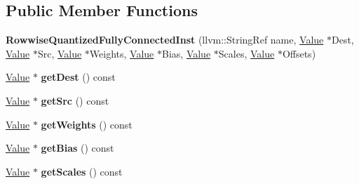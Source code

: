 \subsection*{Public Member Functions}
\begin{DoxyCompactItemize}
\item 
\mbox{\label{classglow_1_1_rowwise_quantized_fully_connected_inst_a772057e235a3455d5b590dc71480998e}} 
{\bfseries Rowwise\+Quantized\+Fully\+Connected\+Inst} (llvm\+::\+String\+Ref name, \hyperlink{classglow_1_1_value}{Value} $\ast$Dest, \hyperlink{classglow_1_1_value}{Value} $\ast$Src, \hyperlink{classglow_1_1_value}{Value} $\ast$Weights, \hyperlink{classglow_1_1_value}{Value} $\ast$Bias, \hyperlink{classglow_1_1_value}{Value} $\ast$Scales, \hyperlink{classglow_1_1_value}{Value} $\ast$Offsets)
\item 
\mbox{\label{classglow_1_1_rowwise_quantized_fully_connected_inst_a5810e81d3864eee9b4a4b1440669f871}} 
\hyperlink{classglow_1_1_value}{Value} $\ast$ {\bfseries get\+Dest} () const
\item 
\mbox{\label{classglow_1_1_rowwise_quantized_fully_connected_inst_a4c6675b9b48c8fa7708df5d521c4031f}} 
\hyperlink{classglow_1_1_value}{Value} $\ast$ {\bfseries get\+Src} () const
\item 
\mbox{\label{classglow_1_1_rowwise_quantized_fully_connected_inst_ae290c20d6ac1b7bdad0468f1068a42dc}} 
\hyperlink{classglow_1_1_value}{Value} $\ast$ {\bfseries get\+Weights} () const
\item 
\mbox{\label{classglow_1_1_rowwise_quantized_fully_connected_inst_a3dae4c5b04cebef974de2e2c654d3b00}} 
\hyperlink{classglow_1_1_value}{Value} $\ast$ {\bfseries get\+Bias} () const
\item 
\mbox{\label{classglow_1_1_rowwise_quantized_fully_connected_inst_aad7e3a4d1d4fad8d28e5aae90720b54c}} 
\hyperlink{classglow_1_1_value}{Value} $\ast$ {\bfseries get\+Scales} () const
\item 
\mbox{\label{classglow_1_1_rowwise_quantized_fully_connected_inst_a17a31c14ceba2fb49be12314c7f7884b}} 

\end{DoxyCompactItemize}
